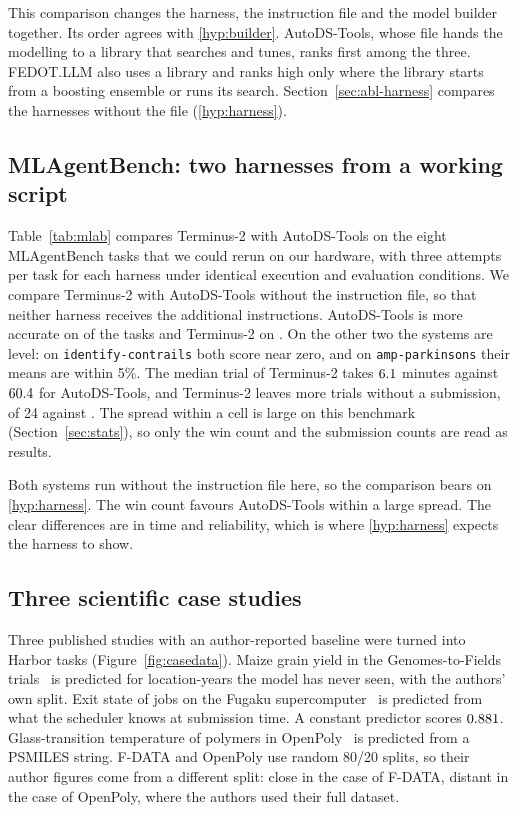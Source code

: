 This comparison changes the harness, the instruction file and the model
builder together. Its order agrees with \ref{hyp:builder}. AutoDS-Tools,
whose file hands the modelling to a library that searches and tunes, ranks
first among the three. FEDOT.LLM also uses a library and ranks high only
where the library starts from a boosting ensemble or runs its search.
Section~\ref{sec:abl-harness} compares the harnesses without the file
(\ref{hyp:harness}).

\subsection{MLAgentBench: two harnesses from a working script}
\label{sec:mlab}

Table~\ref{tab:mlab} compares Terminus-2 with AutoDS-Tools on the eight
MLAgentBench tasks that we could rerun on our hardware, with three attempts
per task for each harness under identical execution and evaluation
conditions. We compare Terminus-2 with AutoDS-Tools without the instruction
file, so that neither harness receives the additional instructions.
AutoDS-Tools is more accurate on \headWinsAutoDS{} of the
\headTasks{} tasks and Terminus-2 on \headWinsTerminus{}. On the other two
the systems are level: on \texttt{identify-contrails} both score near zero,
and on \texttt{amp-parkinsons} their means are within 5\%. The median trial
of Terminus-2 takes $6.1$ minutes against $60.4$ for
AutoDS-Tools, and Terminus-2 leaves more trials without a submission,
\headMissTerminus{} of 24 against \headMissAutoDS{}. The spread within a
cell is large on this benchmark (Section~\ref{sec:stats}), so only the win
count and the submission counts are read as results.

Both systems run without the instruction file here, so the comparison bears
on \ref{hyp:harness}. The win count favours AutoDS-Tools within a large
spread. The clear differences are in time and reliability,
which is where \ref{hyp:harness} expects the harness to show.


\subsection{Three scientific case studies}
\label{sec:cases}

Three published studies with an author-reported baseline were turned into
Harbor tasks (Figure~\ref{fig:casedata}). Maize grain yield in the
Genomes-to-Fields trials~\citep{kick2023yield} is predicted for
location-years the model has never seen, with the authors' own split. Exit
state of jobs on the Fugaku supercomputer~\citep{antici2025fdata} is
predicted from what the scheduler knows at submission time. A constant
predictor scores $0.881$. Glass-transition temperature of polymers
in OpenPoly~\citep{wang2025openpoly} is predicted from a PSMILES string.
F-DATA and OpenPoly use random 80/20 splits, so their author figures come
from a different split: close in the case of F-DATA, distant in the case of
OpenPoly, where the authors used their full dataset.

